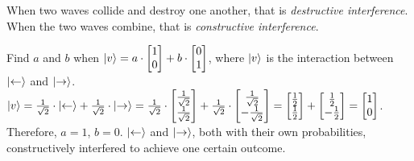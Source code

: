 \newpage

\begin{definition}
    When two waves collide and destroy one another, that is \emph{destructive interference}. When the two waves combine, that is \emph{constructive interference}.
\end{definition}

\begin{example}
    Find $a$ and $b$ when $\lvert v\rangle = a \cdot \begin{bmatrix}
        1\\
        0
    \end{bmatrix} + b \cdot \begin{bmatrix}
        0\\
        1
    \end{bmatrix}$, where $\lvert v\rangle$ is the interaction between $\lvert\leftarrow\rangle$ and $\lvert\rightarrow\rangle$.\\
    $\lvert v\rangle = \frac{1}{\sqrt{2}} \cdot \lvert\leftarrow\rangle + \frac{1}{\sqrt{2}} \cdot \lvert\rightarrow\rangle = \frac{1}{\sqrt{2}} \cdot \begin{bmatrix}\frac{1}{\sqrt{2}}\\\frac{1}{\sqrt{2}}\end{bmatrix} + \frac{1}{\sqrt{2}} \cdot \begin{bmatrix}\frac{1}{\sqrt{2}}\\-\frac{1}{\sqrt{2}}\end{bmatrix} = \begin{bmatrix}\frac{1}{2}\\\frac{1}{2}\end{bmatrix} + \begin{bmatrix}\frac{1}{2}\\-\frac{1}{2}\end{bmatrix} = \begin{bmatrix}1\\0\end{bmatrix}$.\\
    Therefore, $a = 1$, $b = 0$. $\lvert\leftarrow\rangle$ and $\lvert\rightarrow\rangle$, both with their own probabilities, constructively interfered to achieve one certain outcome.
\end{example}



